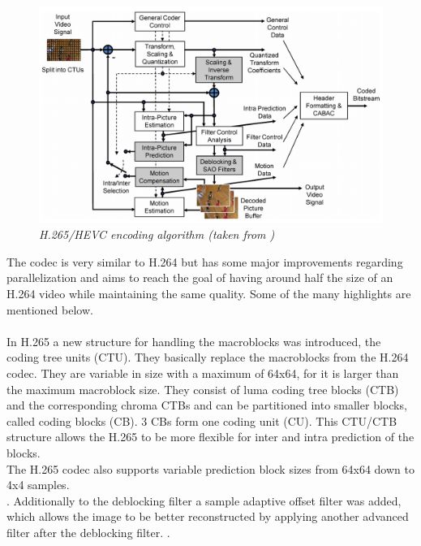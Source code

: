 \begin{figure}[ht]
\centerline{\includegraphics[scale=0.45]{pics/H265_Blockschaltbild}} %
\caption{\label{h265}{\it H.265/HEVC encoding algorithm (taken from \cite{H265_Overview})}}
\end{figure} %

The codec is very similar to H.264 but has some major improvements regarding parallelization and aims to reach the goal of having around half the size of an H.264 video while maintaining the same quality. Some of the many highlights are mentioned below.\\
\\
In H.265 a new structure for handling the macroblocks was introduced, the coding tree units (CTU). They basically replace the macroblocks from the H.264 codec. They are variable in size with a maximum of 64x64, for it is larger than the maximum macroblock size. They consist of luma coding tree blocks (CTB) and the corresponding chroma CTBs and can be partitioned into smaller blocks, called coding blocks (CB). 3 CBs form one coding unit (CU). This CTU/CTB structure allows the H.265 to be more flexible for inter and intra prediction of the blocks.\\
The H.265 codec also supports variable prediction block sizes from 64x64 down to 4x4 samples.\\
.
Additionally to the deblocking filter a sample adaptive offset filter was added, which allows the image to be better reconstructed by applying another advanced filter after the deblocking filter. 
.
